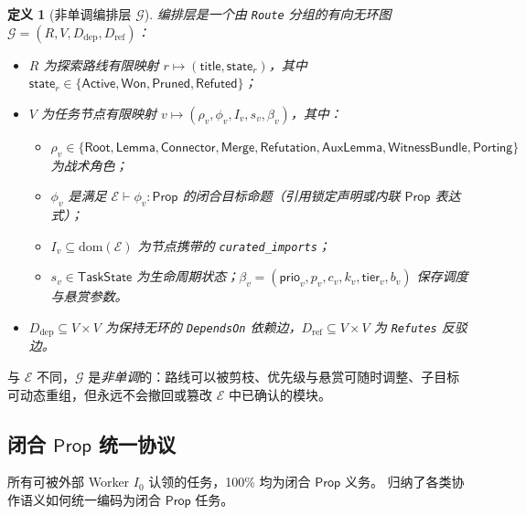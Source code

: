 \documentclass[10pt,a4paper,fontset=fandol]{ctexart}
\newtheorem{definition}[theorem]{定义}
\newcommand{\Truth}{\mathcal{E}}
\newcommand{\Orch}{\mathcal{G}}
\newcommand{\Prop}{\mathsf{Prop}}
\newcommand{\kw}[1]{\mathsf{#1}}
\newcommand{\code}[1]{\texttt{#1}}
\begin{document}
\begin{definition}[非单调编排层 $\Orch$]\label{def:orch-layer}
编排层是一个由 \code{Route} 分组的有向无环图 $\Orch = (R, V, D_{\mathrm{dep}}, D_{\mathrm{ref}})$：
\begin{itemize}
  \item $R$ 为探索路线有限映射 $r \mapsto (\kw{title}, \kw{state}_r)$，其中 $\kw{state}_r \in \{\kw{Active}, \kw{Won}, \kw{Pruned}, \kw{Refuted}\}$；
  \item $V$ 为任务节点有限映射 $v \mapsto (\rho_v, \phi_v, I_v, s_v, \beta_v)$，其中：
    \begin{itemize}
      \item $\rho_v \in \{\kw{Root}, \kw{Lemma}, \kw{Connector}, \kw{Merge}, \kw{Refutation}, \kw{AuxLemma}, \kw{WitnessBundle}, \kw{Porting}\}$ 为战术角色；
      \item $\phi_v$ 是满足 $\Truth \vdash \phi_v : \Prop$ 的\emph{闭合}目标命题（引用锁定声明或内联 $\Prop$ 表达式）；
      \item $I_v \subseteq \mathrm{dom}(\Truth)$ 为节点携带的 \code{curated\_imports}；
      \item $s_v \in \kw{TaskState}$ 为生命周期状态；$\beta_v = (\kw{prio}_v, p_v, c_v, k_v, \kw{tier}_v, b_v)$ 保存调度与悬赏参数。
    \end{itemize}
  \item $D_{\mathrm{dep}} \subseteq V \times V$ 为保持无环的 \code{DependsOn} 依赖边，$D_{\mathrm{ref}} \subseteq V \times V$ 为 \code{Refutes} 反驳边。
\end{itemize}
\end{definition}

与 $\Truth$ 不同，$\Orch$ 是\emph{非单调}的：路线可以被剪枝、优先级与悬赏可随时调整、子目标可动态重组，但永远不会撤回或篡改 $\Truth$ 中已确认的模块。

\subsection{闭合 $\Prop$ 统一协议}
所有可被外部 Worker $I_0$ 认领的任务，100\% 均为闭合 $\Prop$ 义务。 归纳了各类协作语义如何统一编码为闭合 $\Prop$ 任务。
\end{document}
